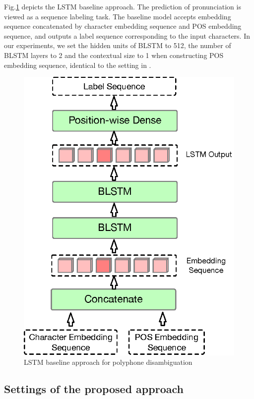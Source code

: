 \documentclass[a4paper]{article}
\begin{document}
Fig.\ref{fig:lstmbaseline} depicts the LSTM baseline approach. The prediction of pronunciation is viewed as a sequence labeling task. The baseline model accepts embedding sequence concatenated by character embedding sequence and POS embedding sequence, and outputs a label sequence corresponding to the input characters. In our experiments, we set the hidden units of BLSTM to 512, the number of BLSTM layers to 2 and the contextual size to 1 when constructing POS embedding sequence, identical to the setting in \cite{shan2016bi}.



\begin{figure}[htbp]
	\centering
	\includegraphics[scale=0.4]{pics3/lstmbaseline2.eps}
	\caption{LSTM baseline approach for polyphone disambiguation}
	\label{fig:lstmbaseline}
\end{figure}

\subsection{Settings of the proposed approach}
\end{document}
